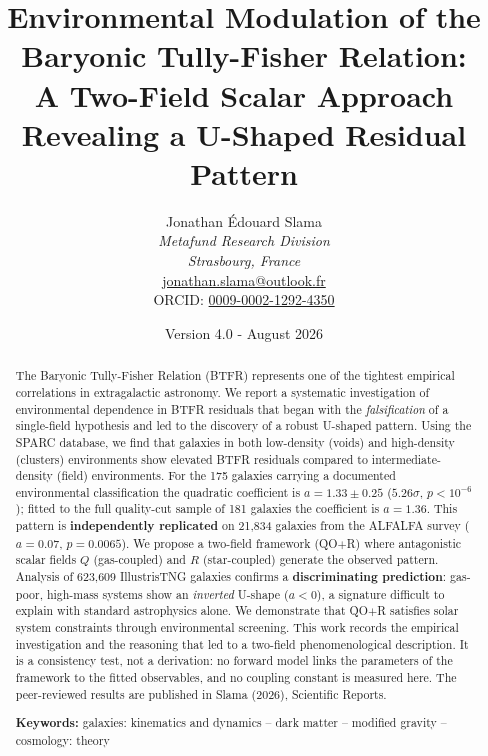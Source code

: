 \documentclass[12pt,a4paper]{article}
\title{
\vspace{-1cm}
\textbf{Environmental Modulation of the Baryonic Tully-Fisher Relation:\\
A Two-Field Scalar Approach Revealing a U-Shaped Residual Pattern}
}
\author{
Jonathan Édouard Slama\\[0.3cm]
\textit{Metafund Research Division}\\
\textit{Strasbourg, France}\\[0.2cm]
\href{mailto:jonathan.slama@outlook.fr}{jonathan.slama@outlook.fr}\\
ORCID: \href{https://orcid.org/0009-0002-1292-4350}{0009-0002-1292-4350}
}
\date{Version 4.0 - August 2026}
\newcommand{\QOR}{QO$+$R}
\begin{document}
\maketitle

\begin{abstract}

The Baryonic Tully-Fisher Relation (BTFR) represents one of the tightest empirical correlations in extragalactic astronomy. We report a systematic investigation of environmental dependence in BTFR residuals that began with the \textit{falsification} of a single-field hypothesis and led to the discovery of a robust U-shaped pattern. Using the SPARC database, we find that galaxies in both low-density (voids) and high-density (clusters) environments show elevated BTFR residuals compared to intermediate-density (field) environments. For the 175 galaxies carrying a documented environmental classification the quadratic coefficient is $a = 1.33 \pm 0.25$ ($5.26\sigma$, $p < 10^{-6}$); fitted to the full quality-cut sample of 181 galaxies the coefficient is $a = 1.36$. This pattern is \textbf{independently replicated} on 21,834 galaxies from the ALFALFA survey ($a = 0.07$, $p = 0.0065$). We propose a two-field framework (\QOR{}) where antagonistic scalar fields $Q$ (gas-coupled) and $R$ (star-coupled) generate the observed pattern. Analysis of 623,609 IllustrisTNG galaxies confirms a \textbf{discriminating prediction}: gas-poor, high-mass systems show an \textit{inverted} U-shape ($a < 0$), a signature difficult to explain with standard astrophysics alone. We demonstrate that \QOR{} satisfies solar system constraints through environmental screening. This work records the empirical investigation and the reasoning that led to a two-field phenomenological description. It is a consistency test, not a derivation: no forward model links the parameters of the framework to the fitted observables, and no coupling constant is measured here. The peer-reviewed results are published in Slama (2026), Scientific Reports.

\vspace{0.3cm}
\noindent\textbf{Keywords:} galaxies: kinematics and dynamics -- dark matter -- modified gravity -- cosmology: theory
\end{abstract}

\newpage
\tableofcontents
\newpage

\end{document}
